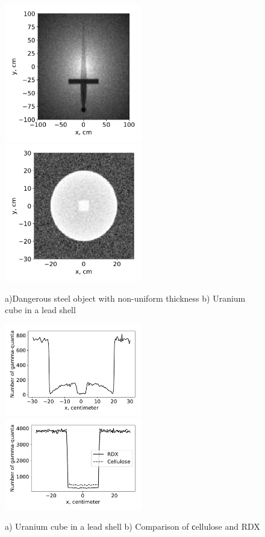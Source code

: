 \documentclass[a4paper]{panl}
\begin{document}
\begin{figure}[t]
    \begin{center}
        \includegraphics[width=60mm]{figures/Sword.pdf} 
        \includegraphics[width=60mm]{figures/UranCube1.pdf}  
        \vspace{-3mm}
        \caption{a)Dangerous steel object with non-uniform thickness b) Uranium cube in a lead shell}
    \end{center}
    \vspace{-5mm}
\end{figure}
\begin{figure}[t]
    \begin{center}
        \includegraphics[width=60mm]{figures/UranCube2.pdf} 
        \includegraphics[width=60mm]{figures/Hex.pdf}  
        \vspace{-3mm}
        \caption{a) Uranium cube in a lead shell b) Comparison of сellulose and RDX}
    \end{center}
    \vspace{-5mm}
\end{figure}
\end{document}
